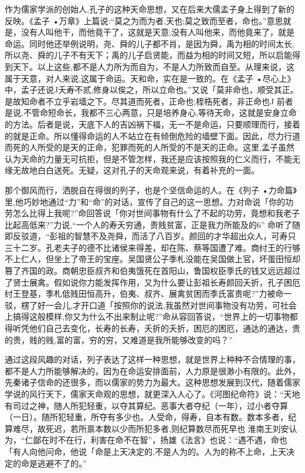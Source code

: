作为儒家学派的创始人,孔子的这种天命思想，又在后来大儒孟子身上得到了新的反映。《孟子 •万章》上篇说:“莫之为而为者,天也;莫之致而至者，命也。”意思就是，没有人叫他干，而他竟干了，这就是天意;没有人叫他来，而他竟来了，就是命运。同时他还举例说明，尧、舜的儿子都不肖，是因为舜，禹为相的时间太长,所以尧、舜的儿子不有天下；禹的儿子启贤能，而益为相的时间又短，所以启能得到天下。以上这些,都不是人力所为而自为，不是人力所致而自至。从理来说，这属于天意，对人来说,这属于命运。天和命，实在是一致的。在《孟子 •尽心上》中，孟子还说J夭寿不贰,修身以俟之，所以立命也。”又说「莫非命也，顺受其正。是故知命者不立乎岩墙之下。尽其道而死者，正命也;桎梏死者，非正命也J 前者是说,不管命短命长，我都不三心两意，只是培养身心,等待天命，这就是安身立命的方法。后者是说，天底下人的吉凶祸下福，无一不是命运，只要顺理而行，接着的就是正命。所以懂得命运的人不站立在有倾倒危险的墙壁下面。因此，尽力行道而死的人所受的是天的正命，犯罪而死的人所受的不是天的正命。这里,孟子虽然认为天命的力量无可抗拒，但是不管怎样，我还是应该按照我的仁义而行，不能无缘无故地白白送死。无疑，这对孔子的天命观来说，有着补充的一面。

那个御风而行，洒脱自在得很的列子，也是个坚信命运的人。在《列子 •力命篇》里,他巧妙地通过“力”和“命”的对话，宣传了自己的这一思想。力对命说「你的功劳怎么比得上我呢?”命回答说「你对世间事物有什么了不起的功劳，竟想和我老子比起高低来?”力说,“一个人的寿夭穷通，贵贱贫富，正是我力所能及的6” 命听了随即反驳道，“彭祖的智慧不及尧舜，而活了八百岁。颜回的才华超出众人，可寿只三十二岁。孔老夫子的德不比诸侯来得差，却在陈、蔡等国遭了难。商纣王的行够不上仁人，但坐上了帝王的宝座。吴国贤公子季札没能在吴国做上官，坏蛋田恒却篡了齐国的政。商朝忠臣叔齐和伯夷饿死在首阳山，鲁国权臣季氏的钱又远远超过了贤士展禽。假如说你力能发挥作用，又为什么要让彭祖长寿颜回夭折，孔子困厄纣王登基，季札低贱田恒高升，伯夷、叔齐、展禽贫困而季氏富贵呢?”力被命一驳，楞了好一会儿,才开口道「按照你的说法,我虽然对世间事物没有功劳，可社会上搞得这般模样,你又为什么不出来制止呢?”命从容回答说，“世界上的一切事物都得听凭他们自己去变化，长寿的长寿，夭折的夭折，困厄的困厄，通达的通达，贵的贵，贱的贱,富的富，穷的穷，又难道是我所能够改变的吗？”

通过这段风趣的对话，列子表达了这样一种思想，就是世界上种种不合情理的事，都不是人力所能够解决的，因为在命运安排面前，人力原是很渺小有限的。此外，先秦诸子信命的还很多，而以儒家的势力为最大。这种思想发展到汉代，随着儒家学说的风行天下，儒家天命观的思想，就更深入人心了。《河图纪命符》说：“天地有司过之神，随人所犯轻重，以夺其算纪。恶事大者夺纪（一年），过小者夺算（一日）。随所犯轻重，所夺有多少也。人受命，得寿，自本有数。数本多者，纪算难尽，故死迟，若所禀本数以少而所犯多者,则纪算数尽而死早也 淮南王刘安认为，“仁鄙在时不在行，利害在命不在智”，扬雄《法言》也说：“遇不遇，命也「有人向他问命，他说「命是上天决定的,不是人为的。人为的称不上命，上天决定的命是逃避不了的。”

